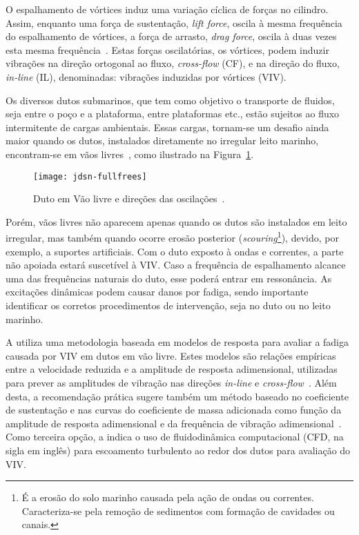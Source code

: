 O espalhamento de vórtices induz uma variação cíclica de forças no cilindro.
Assim, enquanto uma força de sustentação, \textit{lift force}, oscila à mesma frequência do espalhamento de vórtices, a força de arrasto, \textit{drag force}, oscila à duas vezes esta mesma frequência~\cite{Sumer1995}.
Estas forças oscilatórias, os vórtices, podem induzir vibrações na direção ortogonal ao fluxo, \textit{cross-flow} (CF), e na direção do fluxo, \textit{in-line} (IL), denominadas: vibrações induzidas por vórtices (VIV).

Os diversos dutos submarinos, que tem como objetivo o transporte de fluidos, seja entre o poço e a plataforma, entre plataformas etc., estão sujeitos ao fluxo intermitente de cargas ambientais.
Essas cargas, tornam-se um desafio ainda maior quando os dutos, instalados diretamente no irregular leito marinho, encontram-se em vãos livres~\cite{Fyrileiv1998}, como ilustrado na Figura~\ref{fig:jdsn-fullfrees}.

\begin{figure}[!h]
\begin{center}
\texttt{[image: jdsn-fullfrees]}
\caption{Duto em Vão livre e direções das oscilações~\cite{DNV2017}.}
\label{fig:jdsn-fullfrees}
\end{center}
\end{figure}

Porém, vãos livres não aparecem apenas quando os dutos são instalados em leito irregular, mas também quando ocorre erosão posterior (\textit{scouring}\footnote{É a erosão do solo marinho causada pela ação de ondas ou correntes. Caracteriza-se pela remoção de sedimentos com formação de cavidades ou canais.}), devido, por exemplo, a suportes artificiais.
Com o duto exposto à ondas e correntes, a parte não apoiada estará suscetível à VIV.
Caso a frequência de espalhamento alcance uma das frequências naturais do duto, esse poderá entrar em ressonância.
As excitações dinâmicas podem causar danos por fadiga, sendo importante identificar os corretos procedimentos de intervenção, seja no duto ou no leito marinho.

A  utiliza uma metodologia baseada em modelos de resposta para avaliar a fadiga causada por VIV em dutos em vão livre. Estes modelos são relações empíricas entre a velocidade reduzida e a amplitude de resposta adimensional, utilizadas para prever as amplitudes de vibração nas direções \textit{in-line} e \textit{cross-flow}~\cite{Mork2003,DNV2017}. Além desta, a recomendação prática sugere também um método baseado no coeficiente de sustentação e nas curvas do coeficiente de massa adicionada como função da amplitude de resposta adimensional e da frequência de vibração adimensional~\cite{DNV2017}. Como terceira opção, a  indica o uso de fluidodinâmica computacional (CFD, na sigla em inglês) para escoamento turbulento ao redor dos dutos para avaliação do VIV.

